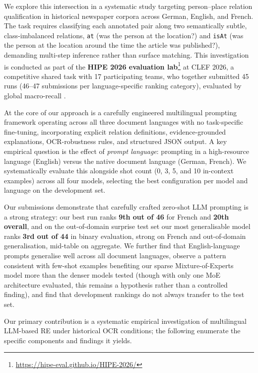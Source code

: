 \documentclass[
]{ceurart}
\theoremstyle{definition}
\begin{document}
We explore this intersection in a systematic study targeting person--place relation qualification in historical newspaper corpora across German, English, and French.
The task requires classifying each annotated pair along two semantically subtle, class-imbalanced relations, \texttt{at} (was the person at the location?) and \texttt{isAt} (was the person at the location around the time the article was published?), demanding multi-step inference rather than surface matching.
This investigation is conducted as part of the \textbf{HIPE 2026 evaluation lab}\footnote{\url{https://hipe-eval.github.io/HIPE-2026/}} at CLEF 2026, a competitive shared task with 17 participating teams, who together submitted 45 runs (46--47 submissions per language-specific ranking category), evaluated by global macro-recall \citep{opitz_extended_2026, opitz_overview_2026}.

At the core of our approach is a carefully engineered multilingual prompting framework operating across all three document languages with no task-specific fine-tuning, incorporating explicit relation definitions, evidence-grounded explanations, OCR-robustness rules, and structured JSON output.
A key empirical question is the effect of \emph{prompt language}: prompting in a high-resource language (English) versus the native document language (German, French).
We systematically evaluate this alongside shot count (0, 3, 5, and 10 in-context examples) across all four models, selecting the best configuration per model and language on the development set.

Our submissions demonstrate that carefully crafted zero-shot LLM prompting is a strong strategy: our best run ranks \textbf{9th out of 46} for French and \textbf{20th overall}, and on the out-of-domain surprise test set our most generalisable model ranks \textbf{3rd out of 44} in binary evaluation, strong on French and out-of-domain generalisation, mid-table on aggregate.
We further find that English-language prompts generalise well across all document languages, observe a pattern consistent with few-shot examples benefiting our sparse Mixture-of-Experts model more than the denser models tested (though with only one MoE architecture evaluated, this remains a hypothesis rather than a controlled finding), and find that development rankings do not always transfer to the test set.

Our primary contribution is a systematic empirical investigation of multilingual LLM-based RE under historical OCR conditions; the following enumerate the specific components and findings it yields.
\end{document}
